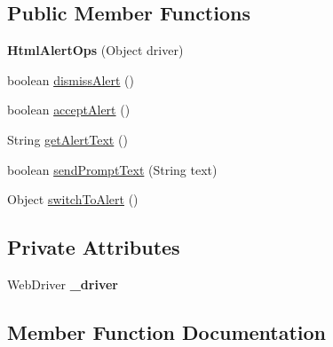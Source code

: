 \subsection*{Public Member Functions}
\begin{DoxyCompactItemize}
\item 
\hypertarget{classcom_1_1zeuslearning_1_1automation_1_1selenium_1_1interactions_1_1HtmlAlertOps_ab09a06ea3ed01565d953c072fdff58ca}{}\label{classcom_1_1zeuslearning_1_1automation_1_1selenium_1_1interactions_1_1HtmlAlertOps_ab09a06ea3ed01565d953c072fdff58ca} 
{\bfseries Html\+Alert\+Ops} (Object driver)
\item 
boolean \hyperlink{classcom_1_1zeuslearning_1_1automation_1_1selenium_1_1interactions_1_1HtmlAlertOps_aac58187434100d2fe2091f388f082c22}{dismiss\+Alert} ()
\item 
boolean \hyperlink{classcom_1_1zeuslearning_1_1automation_1_1selenium_1_1interactions_1_1HtmlAlertOps_ab29d982ce85b76e2f85b09d0c724f331}{accept\+Alert} ()
\item 
String \hyperlink{classcom_1_1zeuslearning_1_1automation_1_1selenium_1_1interactions_1_1HtmlAlertOps_a7d65f164e9145ca8035e196c7dd7da87}{get\+Alert\+Text} ()
\item 
boolean \hyperlink{classcom_1_1zeuslearning_1_1automation_1_1selenium_1_1interactions_1_1HtmlAlertOps_a22d69cc0ac8d155f99a5dc1e48db142d}{send\+Prompt\+Text} (String text)
\item 
Object \hyperlink{classcom_1_1zeuslearning_1_1automation_1_1selenium_1_1interactions_1_1HtmlAlertOps_a60bf8794a0914518cf2c670b478fb6c6}{switch\+To\+Alert} ()
\end{DoxyCompactItemize}
\subsection*{Private Attributes}
\begin{DoxyCompactItemize}
\item 
\hypertarget{classcom_1_1zeuslearning_1_1automation_1_1selenium_1_1interactions_1_1HtmlAlertOps_a7f72cfaa75ec3f827b994839243565b5}{}\label{classcom_1_1zeuslearning_1_1automation_1_1selenium_1_1interactions_1_1HtmlAlertOps_a7f72cfaa75ec3f827b994839243565b5} 
Web\+Driver {\bfseries \+\_\+driver}
\end{DoxyCompactItemize}


\subsection{Member Function Documentation}
\hypertarget{classcom_1_1zeuslearning_1_1automation_1_1selenium_1_1interactions_1_1HtmlAlertOps_ab29d982ce85b76e2f85b09d0c724f331}{}\label{classcom_1_1zeuslearning_1_1automation_1_1selenium_1_1interactions_1_1HtmlAlertOps_ab29d982ce85b76e2f85b09d0c724f331} 
